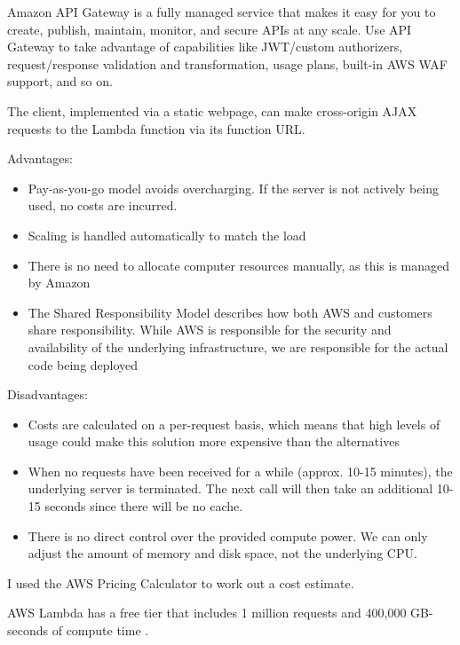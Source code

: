 Amazon API Gateway is a fully managed service that makes it easy for you to create, publish, maintain, monitor, and secure APIs at any scale. Use API Gateway to take advantage of capabilities like JWT/custom authorizers, request/response validation and transformation, usage plans, built-in AWS WAF support, and so on. \cite{casalboni-2022}

The client, implemented via a static webpage, can make cross-origin AJAX requests to the Lambda function via its function URL.

Advantages:

\begin{itemize}
\item Pay-as-you-go model avoids overcharging. If the server is not actively being used, no costs are incurred.
\item Scaling is handled automatically to match the load
\item There is no need to allocate computer resources manually, as this is managed by Amazon
\item The Shared Responsibility Model describes how both AWS and customers share responsibility. While AWS is responsible for the security and availability of the underlying infrastructure, we are responsible for the actual code being deployed \cite{amazon-web-services-inc-2022B}
\end{itemize}


Disadvantages:

\begin{itemize}
\item Costs are calculated on a per-request basis, which means that high levels of usage could make this solution more expensive than the alternatives
\item When no requests have been received for a while (approx. 10-15 minutes), the underlying server is terminated. The next call will then take an additional 10-15 seconds since there will be no cache.
\item There is no direct control over the provided compute power. We can only adjust the amount of memory and disk space, not the underlying CPU.
\end{itemize}

I used the AWS Pricing Calculator \cite{amazon-web-services-inc-2022C} to work out a cost estimate.

AWS Lambda has a free tier that includes 1 million requests and 400,000 GB-seconds of compute time \cite{amazon-web-services-inc-2022A}.

